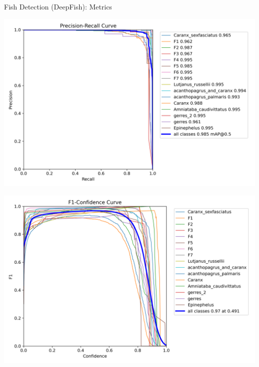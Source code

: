 \documentclass[serif]{beamer}  %
\begin{document}
\begin{frame}{Fish Detection (DeepFish): Metrics}
    \centering
    \begin{minipage}{0.49\linewidth}
        \includegraphics[width=\linewidth]{images/BoxPR_curve.png}
    \end{minipage}
    \hfill
    \begin{minipage}{0.49\linewidth}
        \includegraphics[width=\linewidth]{images/BoxF1_curve.png}
    \end{minipage}
    
\end{frame}
\end{document}
